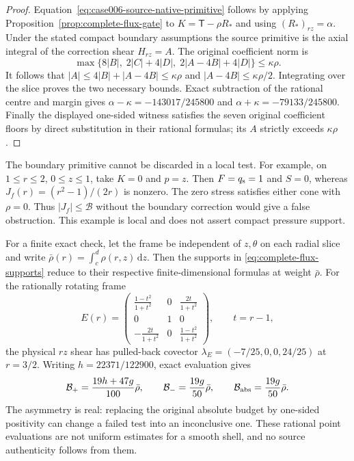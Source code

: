 \documentclass[11pt,a4paper]{article}
\theoremstyle{plain}
\theoremstyle{definition}
\newcommand{\dd}{\,\mathrm{d}}
\begin{document}
\begin{proof}
Equation~\eqref{eq:case006-source-native-primitive} follows by
applying Proposition~\ref{prop:complete-flux-gate} to
$K=\mathsf T-\rho R_*$ and using $(R_*)_{rz}=\alpha$.
Under the stated compact boundary assumptions the source primitive
is the axial integral of the correction shear $H_{rz}=A$.
The original coefficient norm is
\[
 \max\{8|B|,\;2|C|+4|D|,\;
              2|A-4B|+4|D|\}\le\kappa\rho.
\]
It follows that $|A|\le 4|B|+|A-4B|\le\kappa\rho$ and
$|A-4B|\le\kappa\rho/2$. Integrating over the slice proves
the two necessary bounds. Exact subtraction of the rational
centre and margin gives
$\alpha-\kappa=-143017/245800$ and
$\alpha+\kappa=-79133/245800$.
Finally the displayed one-sided witness satisfies the seven
original coefficient floors by direct substitution in their
rational formulas; its $A$ strictly exceeds $\kappa\rho$.
\end{proof}

The boundary primitive cannot be discarded in a local test. For
example, on $1\le r\le2$, $0\le z\le1$, take $K=0$ and $p=z$.
Then $F=q_{\rm s}=1$ and $S=0$, whereas
$J_f(r)=(r^2-1)/(2r)$ is nonzero. The zero stress satisfies either
cone with $\rho=0$. Thus $|J_f|\le\mathcal B$ without the
boundary correction would give a false obstruction. This example
is local and does not assert compact pressure support.

For a finite exact check, let the frame be independent of $z,\theta$
on each radial slice and write
$\bar\rho(r)=\int_c^d\rho(r,z)\dd z$.
Then the supports in \eqref{eq:complete-flux-supports} reduce to
their respective finite-dimensional formulas at weight $\bar\rho$.
For the rationally rotating frame
\[
 E(r)=\begin{pmatrix}
 \frac{1-t^2}{1+t^2}&0&\frac{2t}{1+t^2}\\
 0&1&0\\
 -\frac{2t}{1+t^2}&0&\frac{1-t^2}{1+t^2}
 \end{pmatrix},\qquad t=r-1,
\]
the physical $rz$ shear has pulled-back covector
$\lambda_E=(-7/25,0,0,24/25)$ at $r=3/2$. Writing
$h=22371/122900$, exact evaluation gives
\begin{equation}\label{eq:rotating-shear-exact}
 \mathcal B_+=\frac{19h+47g}{100}\bar\rho,
 \qquad\mathcal B_-=\frac{19g}{50}\bar\rho,
 \qquad\mathcal B_{\rm abs}=\frac{19g}{50}\bar\rho.
\end{equation}
The asymmetry is real: replacing the original absolute budget by
one-sided positivity can change a failed test into an inconclusive
one. These rational point evaluations are not uniform estimates for
a smooth shell, and no source authenticity follows from them.
\end{document}

